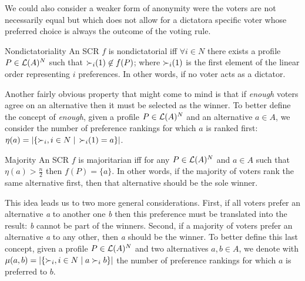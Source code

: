 	We could also consider a weaker form of anonymity were the voters are not necessarily equal but which does not allow for a dictator\textemdash a specific voter whose preferred choice is always the outcome of the voting rule. 

	\begin{genthm}{Nondictatoriality}
	An \acs{SCR} $f$ is nondictatorial iff $\forall i \in N$ there exists a profile $P \in\mathcal{L}(A)^{N}$ such that $\mathop{\prefi}(1) \not\in f(P)$; where $\mathop{\prefi}(1)$ is the first element of the linear order representing $i$ preferences. In other words, if no voter acts as a dictator.
	\end{genthm}


	Another fairly obvious property that might come to mind is that if \textit{enough} voters agree on an alternative then it must be selected as the winner. To better define the concept of \textit{enough}, given a profile $P\in\mathcal{L}(A)^{N}$ and an alternative $a\in A$, we consider the number of preference rankings for which $a$ is ranked first: $\eta(a)=|\{\mathop{\prefi}, i \in N \suchthat \mathop{\prefi}(1)=a\}|$.


	\begin{genthm}{Majority}
	An \acs{SCR} $f$ is majoritarian iff for any $P\in\mathcal{L}(A)^{N}$ and $a \in A$ such that $\eta(a)> \frac{n}{2}$ then $f(P)=\{a\}$. In other words, if the majority of voters rank the same alternative first, then that alternative should be the sole winner.
	\end{genthm}

	This idea leads us to two more general considerations. First, if all voters prefer an alternative \textit{a} to another one \textit{b} then this preference must be translated into the result: \textit{b} cannot be part of the winners. 
	Second, if a majority of voters prefer an alternative \textit{a} to any other, then \textit{a} should be the winner. 
	To better define this last concept, given a profile $P\in\mathcal{L}(A)^{N}$ and two alternatives $a,b\in A$, we denote with $\mu(a,b)=|\{\mathop{\prefi}, i \in N \suchthat a\prefi b\}|$ the number of preference rankings for which $a$ is preferred to $b$.

